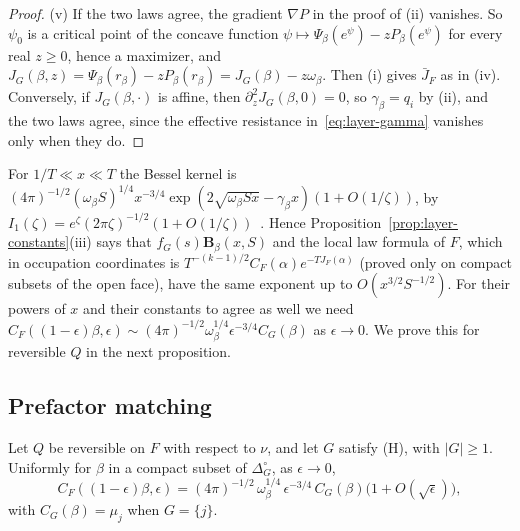 \begin{proof}
(v) If the two laws agree, the gradient $\nabla P$ in the proof of (ii) vanishes. So
$\psi_0$ is a critical point of the concave function $\psi\mapsto\Psi_\beta(e^\psi)-zP_\beta(e^\psi)$
for every real $z\ge0$, hence a maximizer, and
$J_G(\beta,z)=\Psi_\beta(r_\beta)-zP_\beta(r_\beta)=J_G(\beta)-z\omega_\beta$. Then (i) gives
$\bar J_F$ as in (iv). Conversely, if $J_G(\beta,\cdot)$ is affine, then
$\partial_z^2J_G(\beta,0)=0$, so $\gamma_\beta=q_i$ by (ii), and the two laws agree, since the
effective resistance in~\eqref{eq:layer-gamma} vanishes only when they do.
\end{proof}

For $1/T\ll x\ll T$ the Bessel kernel is
$(4\pi)^{-1/2}(\omega_\beta S)^{1/4}x^{-3/4}\exp(2\sqrt{\omega_\beta Sx}-\gamma_\beta x)(1+O(1/\zeta))$,
by $I_1(\zeta)=e^\zeta(2\pi\zeta)^{-1/2}(1+O(1/\zeta))$~\cite[Eq.~10.40.1]{dlmf}. Hence
Proposition~\ref{prop:layer-constants}(iii) says that $f_G(s)\mathbf B_\beta(x,S)$ and the local
law formula of $F$, which in occupation coordinates is $T^{-(k-1)/2}C_F(\alpha)e^{-TJ_F(\alpha)}$
(proved only on compact subsets of the open face), have
the same exponent up to $O(x^{3/2}S^{-1/2})$. For their powers of $x$ and their constants to
agree as well we need $C_F((1-\epsilon)\beta,\epsilon)\sim(4\pi)^{-1/2}\omega_\beta^{1/4}\epsilon^{-3/4}C_G(\beta)$
as $\epsilon\to0$. We prove this for reversible $Q$ in the next proposition.

\subsection{Prefactor matching}\label{sec:layer-prefactor}

\begin{proposition}\label{prop:layer-prefactor}
Let $Q$ be reversible on $F$ with respect to $\nu$, and let $G$ satisfy \textup{(H)}, with $|G|\ge1$.
Uniformly for $\beta$ in a compact subset of $\Delta_G^\circ$, as $\epsilon\to0$,
\[
C_F((1-\epsilon)\beta,\epsilon)=(4\pi)^{-1/2}\,\omega_\beta^{1/4}\,\epsilon^{-3/4}\,C_G(\beta)\bigl(1+O(\sqrt\epsilon)\bigr),
\]
with $C_G(\beta)=\mu_j$ when $G=\{j\}$.
\end{proposition}

